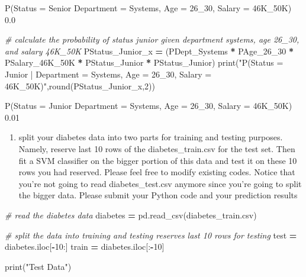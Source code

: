 \documentclass[
]{article}
\newenvironment{Shaded}{\begin{snugshade}}{\end{snugshade}}
\newcommand{\BuiltInTok}[1]{#1}
\newcommand{\CommentTok}[1]{\textcolor[rgb]{0.56,0.35,0.01}{\textit{#1}}}
\newcommand{\DecValTok}[1]{\textcolor[rgb]{0.00,0.00,0.81}{#1}}
\newcommand{\NormalTok}[1]{#1}
\newcommand{\OperatorTok}[1]{\textcolor[rgb]{0.81,0.36,0.00}{\textbf{#1}}}
\newcommand{\StringTok}[1]{\textcolor[rgb]{0.31,0.60,0.02}{#1}}
\providecommand{\tightlist}{%
  \setlength{\itemsep}{0pt}\setlength{\parskip}{0pt}}
\begin{document}
P(Status = Senior \textbar{} Department = Systems, Age = 26\_30, Salary
= 46K\_50K) 0.0

\begin{Shaded}
\begin{Highlighting}[]
\CommentTok{\# calculate the probability of status junior given department systems, age 26\_30, and salary 46K\_50K}
\NormalTok{PStatus\_Junior\_x }\OperatorTok{=}\NormalTok{ (PDept\_Systems }\OperatorTok{*}\NormalTok{ PAge\_26\_30 }\OperatorTok{*}\NormalTok{ PSalary\_46K\_50K }\OperatorTok{*}\NormalTok{ PStatus\_Junior }\OperatorTok{*}\NormalTok{ PStatus\_Junior)}
\BuiltInTok{print}\NormalTok{(}\StringTok{"P(Status = Junior | Department = Systems, Age = 26\_30, Salary = 46K\_50K)"}\NormalTok{,}\BuiltInTok{round}\NormalTok{(PStatus\_Junior\_x,}\DecValTok{2}\NormalTok{))}
\end{Highlighting}
\end{Shaded}

P(Status = Junior \textbar{} Department = Systems, Age = 26\_30, Salary
= 46K\_50K) 0.01

\begin{enumerate}
\def\labelenumi{\arabic{enumi}.}
\setcounter{enumi}{1}
\tightlist
\item
  split your diabetes data into two parts for training and testing
  purposes. Namely, reserve last 10 rows of the diabetes\_train.csv for
  the test set. Then fit a SVM classifier on the bigger portion of this
  data and test it on these 10 rows you had reserved. Please feel free
  to modify existing codes. Notice that you're not going to read
  diabetes\_test.csv anymore since you're going to split the bigger
  data. Please submit your Python code and your prediction results
\end{enumerate}

\begin{Shaded}
\begin{Highlighting}[]
\CommentTok{\# read the diabetes data}
\NormalTok{diabetes }\OperatorTok{=}\NormalTok{ pd.read\_csv(}\StringTok{\textquotesingle{}diabetes\_train.csv\textquotesingle{}}\NormalTok{)}

\CommentTok{\# split the data into training and testing reserves last 10 rows for testing}
\NormalTok{test }\OperatorTok{=}\NormalTok{ diabetes.iloc[}\OperatorTok{{-}}\DecValTok{10}\NormalTok{:]}
\NormalTok{train }\OperatorTok{=}\NormalTok{ diabetes.iloc[:}\OperatorTok{{-}}\DecValTok{10}\NormalTok{]}

\BuiltInTok{print}\NormalTok{(}\StringTok{"Test Data"}\NormalTok{)}
\end{Highlighting}
\end{Shaded}
\end{document}
